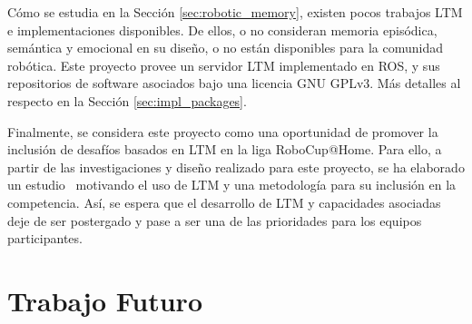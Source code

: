 \begin{conclusion}




Cómo se estudia en la Sección \ref{sec:robotic_memory}, existen pocos trabajos LTM e implementaciones disponibles. De ellos, o no consideran memoria episódica, semántica y emocional en su diseño, o no están disponibles para la comunidad robótica. Este proyecto provee un servidor LTM implementado en ROS, y sus repositorios de software asociados bajo una licencia GNU GPLv3. Más detalles al respecto en la Sección \ref{sec:impl_packages}.

Finalmente, se considera este proyecto como una oportunidad de promover la inclusión de desafíos basados en LTM en la liga RoboCup@Home. Para ello, a partir de las investigaciones y diseño realizado para este proyecto, se ha elaborado un estudio~\cite{ltm_in_robocup} motivando el uso de LTM y una metodología para su inclusión en la competencia. Así, se espera que el desarrollo de LTM y capacidades asociadas deje de ser postergado y pase a ser una de las prioridades para los equipos participantes.

\section*{Trabajo Futuro}




\end{conclusion}